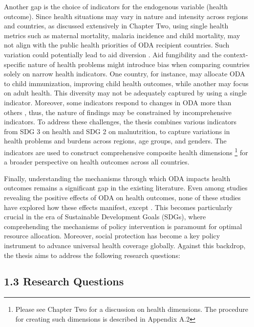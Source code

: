Another gap is the choice of indicators for the endogenous variable (health outcome). Since health situations may vary in nature and intensity across regions and countries, as discussed extensively in Chapter Two, using single health metrics such as maternal mortality, malaria incidence and child mortality, may not align with the public health priorities of ODA recipient countries. Such variation could potentially lead to aid diversion \parencite{ogbuoji_aid_2018}. Aid fungibility and the context-specific nature of health problems might introduce bias when comparing countries solely on narrow health indicators. One country, for instance, may allocate ODA to child immunization, improving child health outcomes, while another may focus on adult health. This diversity may not be adequately captured by using a single indicator. Moreover, some indicators respond to changes in ODA more than others \parencite{doucouliagos_health_2021},  thus, the nature of findings may be constrained by incomprehensive indicators. To address these challenges, the thesis combines various indicators from SDG 3 on health and SDG 2 on malnutrition, to capture variations in health problems and burdens across regions, age groups, and genders. The indicators are used to construct comprehensive composite health dimensions \footnote{Please see Chapter Two for a discussion on health dimensions. The procedure for creating such dimensions is described in Appendix A.2} for a broader perspective on health outcomes across all countries.

Finally, understanding the mechanisms through which ODA impacts health outcomes remains a significant gap in the existing literature. Even among studies revealing the positive effects of ODA on health outcomes, none of these studies have explored how these effects manifest, except \parencite[]{yogo_health_2015}. This becomes particularly crucial in the era of Sustainable Development Goals (SDGs), where comprehending the mechanisms of policy intervention is paramount for optimal resource allocation. Moreover, social protection has become a key policy instrument to advance universal health coverage globally.  Against this backdrop, the thesis aims to address the following research questions:




\subsection*{1.3 Research Questions}


